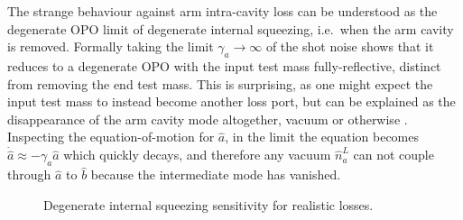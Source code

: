 The strange behaviour against arm intra-cavity loss can be understood as the degenerate OPO limit of degenerate internal squeezing, i.e.\ when the arm cavity is removed. Formally taking the limit $\gamma_a\rightarrow\infty$ of the shot noise shows that it reduces to a degenerate OPO with the input test mass fully-reflective, distinct from removing the end test mass.  This is surprising, as one might expect the input test mass to instead become another loss port, but can be explained as the disappearance of the arm cavity mode altogether, vacuum or otherwise . Inspecting the equation-of-motion for $\hat a$, in the limit the equation becomes $\dot{\hat a}\approx -\gamma_a \hat a$ which quickly decays, and therefore any vacuum $\hat n^L_a$ can not couple through $\hat a$ to $\hat b$ because the intermediate mode has vanished.


\begin{figure}
	\centering
	\caption{Degenerate internal squeezing sensitivity for realistic losses.}
	\label{fig:dIS_realistic_loss}
\end{figure}

